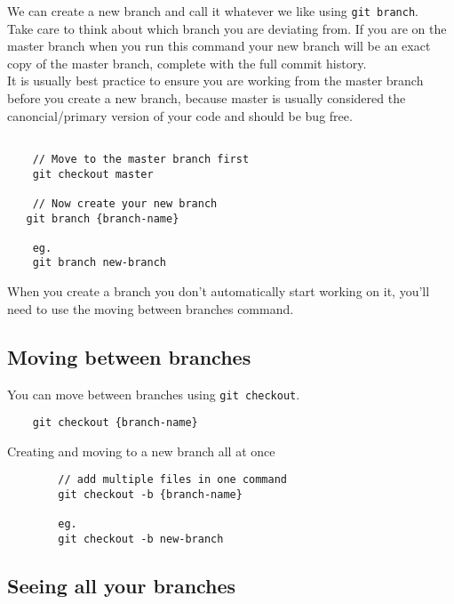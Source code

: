 We can create a new branch and call it whatever we like using \texttt{git branch}.
\\

Take care to think about which branch you are deviating from. If you are on the master branch when you run this command your new branch will be an exact copy of the master branch, complete with the full commit history.
\\

It is usually best practice to ensure you are working from the master branch before you create a new branch, because master is usually considered the canoncial/primary version of your code and should be bug free.

\begin{verbatim}

    // Move to the master branch first
    git checkout master

    // Now create your new branch
   git branch {branch-name}

    eg.
    git branch new-branch
\end{verbatim}

When you create a branch you don't automatically start working on it, you'll need to use the moving between branches command.
\\

\subsection{Moving between branches}

You can move between branches using \texttt{git checkout}.

\begin{verbatim}
    git checkout {branch-name}
\end{verbatim}

\begin{infobox}{Creating and moving to a new branch all at once}
    \begin{verbatim}
        // add multiple files in one command
        git checkout -b {branch-name}

        eg.
        git checkout -b new-branch
    \end{verbatim}
\end{infobox}


\subsection{Seeing all your branches}

